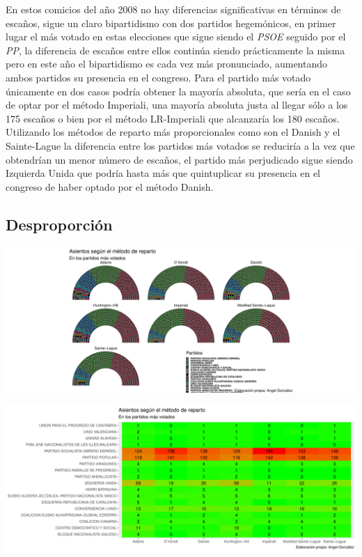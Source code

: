 \documentclass[12pt,a4paper,]{book}
\numberwithin{dummy}{section}
\theoremstyle{ocrenumbox}
\theoremstyle{blacknumex}
\theoremstyle{blacknumbox}
\theoremstyle{ocrenum}
\theoremstyle{ocrenum}
\begin{document}
En estos comicios del año 2008 no hay diferencias significativas en
términos de escaños, sigue un claro bipartidismo con dos partidos
hegemónicos, en primer lugar el más votado en estas elecciones que sigue
siendo el \emph{PSOE} seguido por el \emph{PP}, la diferencia de escaños
entre ellos continúa siendo prácticamente la misma pero en este año el
bipartidismo es cada vez más pronunciado, aumentando ambos partidos su
presencia en el congreso. Para el partido más votado únicamente en dos
casos podría obtener la mayoría absoluta, que sería en el caso de optar
por el método Imperiali, una mayoría absoluta justa al llegar sólo a los
175 escaños o bien por el método LR-Imperiali que alcanzaría los 180
escaños. Utilizando los métodos de reparto más proporcionales como son
el Danish y el Sainte-Lague la diferencia entre los partidos más votados
se reduciría a la vez que obtendrían un menor número de escaños, el
partido más perjudicado sigue siendo Izquierda Unida que podría hasta
más que quintuplicar su presencia en el congreso de haber optado por el
método Danish.

\hypertarget{desproporciuxf3n-9}{%
\subsection{Desproporción}\label{desproporciuxf3n-9}}

\begin{center}\includegraphics[width=1\linewidth]{figurasR/unnamed-chunk-106-1} \end{center}

\begin{center}\includegraphics[width=1\linewidth]{figurasR/unnamed-chunk-106-2} \end{center}
\end{document}
